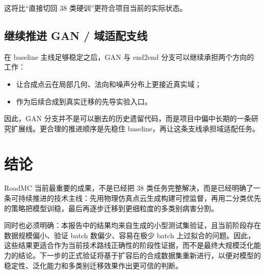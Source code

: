 \documentclass[12pt]{ctexart}
\begin{document}
这将比“直接切回 38 类硬训”更符合项目当前的实际状态。

\subsection{继续推进 GAN / 域适配支线}

在 baseline 主线足够稳定之后，GAN 与 end2end 分支可以继续承担两个方向的工作：

\begin{itemize}
  \item 让合成点云在局部几何、法向和噪声分布上更接近真实域；
  \item 作为后续合成到真实迁移的先导实验入口。
\end{itemize}

因此，GAN 分支并不是可以删去的历史遗留代码，而是项目中偏中长期的一条研究扩展线。更合理的推进顺序是先稳住 baseline，再让这条支线承担域适配任务。

\section{结论}

RoadMC 当前最重要的成果，不是已经把 38 类任务完整解决，而是已经明确了一条可持续推进的技术主线：先用物理仿真点云生成构建可控监督，再用二分类优先的策略把模型训稳，最后再逐步迁移到更细粒度的多类别病害分割。

同时也必须明确：本报告中的结果均来自生成的小型测试集验证，且当前阶段存在数据规模偏小、验证 batch 数偏少、容易在极少 batch 上过拟合的问题。因此，这些结果更适合作为当前技术路线正确性的阶段性证据，而不是最终大规模泛化能力的结论。下一步的正式验证将基于扩容后的合成数据集重新进行，以便对模型的稳定性、泛化能力和多类别迁移效果作出更可信的判断。
\end{document}

